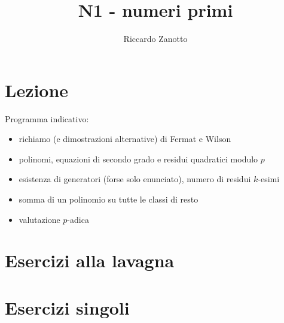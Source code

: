 \documentclass[12pt]{article}
\author{Riccardo Zanotto}
\title{N1 - numeri primi}
\begin{document}
\maketitle


\section{Lezione}

Programma indicativo:

\begin{itemize}
    \item richiamo (e dimostrazioni alternative) di Fermat e Wilson
    \item polinomi, equazioni di secondo grado e residui quadratici modulo $p$
    \item esistenza di generatori (forse solo enunciato), numero di residui $k$-esimi
    \item somma di un polinomio su tutte le classi di resto
    \item valutazione $p$-adica
\end{itemize}

\section{Esercizi alla lavagna}

\section{Esercizi singoli}
\end{document}
